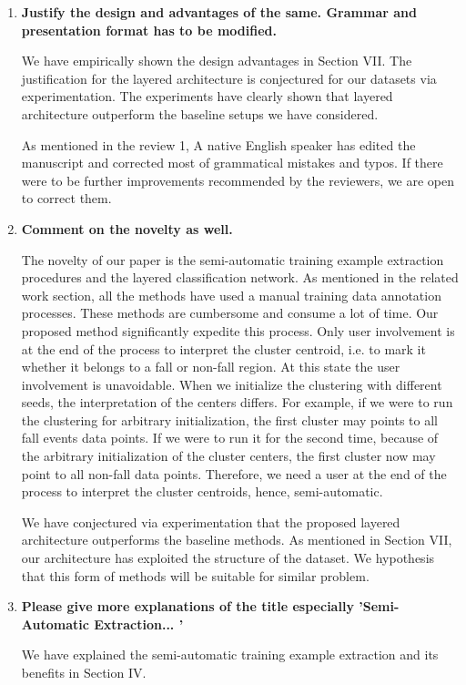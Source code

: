 \documentclass[12pt]{article}
\begin{document}
\begin{enumerate}

\item \textbf{Justify the design and advantages of the same. Grammar and presentation 
format has to be modified.}

We have empirically shown the design advantages in Section VII. The justification for the 
layered architecture is conjectured for our datasets via experimentation. The experiments 
have clearly shown that layered architecture outperform the baseline setups we have 
considered. 

As mentioned in the review 1, A native 
English 
speaker has edited the manuscript and corrected most of grammatical mistakes and typos.  
If there 
were to be further improvements recommended by the reviewers, we are open to correct 
them.  

\item \textbf{Comment on the novelty as well.}

The novelty of our paper is the semi-automatic training example extraction procedures and 
the layered classification network. As 
mentioned in the related work section, all the methods have used a manual training data 
annotation processes. These methods are cumbersome and consume a lot of time. Our 
proposed 
method significantly expedite this process. Only user involvement is at the end of the 
process to interpret the cluster centroid, i.e. to mark it whether it belongs to a fall 
or 
non-fall region. At this state the user involvement is unavoidable. When we initialize 
the clustering with different seeds, the interpretation of the centers differs. For 
example, if we were to run the clustering for 
arbitrary initialization, the first cluster may points to all fall events data points. If 
we were to run it for the second time, because of the arbitrary initialization of the 
cluster centers, the first cluster now may point to all non-fall data points. Therefore, 
we need a user at the end of the process to interpret the cluster centroids, hence, 
semi-automatic.

We have conjectured via experimentation that the proposed layered architecture 
outperforms the baseline methods. As mentioned in Section VII, our architecture has 
exploited the structure of the dataset. We hypothesis that this form of methods will be 
suitable for similar problem. 

\item \textbf{Please give more explanations of the title especially 'Semi-Automatic 
Extraction... '}

We have explained the semi-automatic training example extraction and its  benefits in 
Section IV. 

\end{enumerate}
\end{document}
